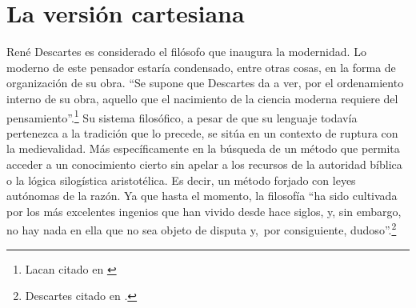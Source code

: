 \section{La versión cartesiana}


René Descartes es considerado el filósofo que inaugura la modernidad. Lo moderno de este pensador estaría condensado, entre otras cosas, en la forma de organización de su obra. \enquote{Se supone que Descartes da a ver, por el ordenamiento interno de su obra, aquello que el nacimiento de la ciencia moderna requiere del pensamiento}.\footnote{Lacan citado en \cite[][41]{@7128-MILNER1999}} Su sistema filosófico, a pesar de que su lenguaje todavía pertenezca a la tradición que lo precede, se sitúa en un contexto de ruptura con la medievalidad. Más específicamente en la búsqueda de un método que permita acceder a un conocimiento cierto sin apelar a los recursos de la autoridad bíblica o la lógica silogística aristotélica. Es decir, un método forjado con leyes autónomas de la razón. Ya que hasta el momento, la filosofía \enquote{ha sido cultivada por los más excelentes ingenios que han vivido desde hace siglos, y, sin embargo, no hay nada en ella que no sea objeto de disputa y,~por consiguiente, dudoso}.\footnote{Descartes citado en \cite[][164]{@7114-CARPIO1980}.}

